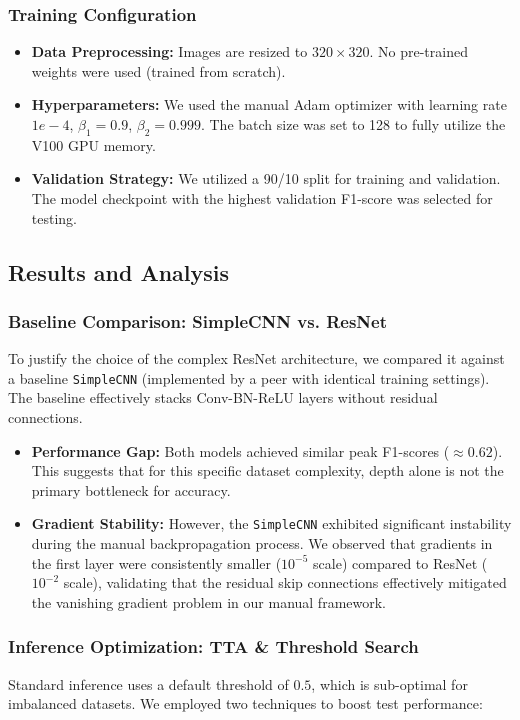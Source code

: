 \subsubsection{Training Configuration}
\begin{itemize}
    \item \textbf{Data Preprocessing:} Images are resized to $320 \times 320$. No pre-trained weights were used (trained from scratch).
    \item \textbf{Hyperparameters:} We used the manual Adam optimizer with learning rate $1e-4$, $\beta_1=0.9$, $\beta_2=0.999$. The batch size was set to 128 to fully utilize the V100 GPU memory.
    \item \textbf{Validation Strategy:} We utilized a 90/10 split for training and validation. The model checkpoint with the highest validation F1-score was selected for testing.
\end{itemize}

\subsection{Results and Analysis}

\subsubsection{Baseline Comparison: SimpleCNN vs. ResNet}
To justify the choice of the complex ResNet architecture, we compared it against a baseline \texttt{SimpleCNN} (implemented by a peer with identical training settings). The baseline effectively stacks Conv-BN-ReLU layers without residual connections.

\begin{itemize}
    \item \textbf{Performance Gap:} Both models achieved similar peak F1-scores ($\approx 0.62$). This suggests that for this specific dataset complexity, depth alone is not the primary bottleneck for accuracy.
    \item \textbf{Gradient Stability:} However, the \texttt{SimpleCNN} exhibited significant instability during the manual backpropagation process. We observed that gradients in the first layer were consistently smaller ($10^{-5}$ scale) compared to ResNet ($10^{-2}$ scale), validating that the residual skip connections effectively mitigated the vanishing gradient problem in our manual framework.
\end{itemize}

\subsubsection{Inference Optimization: TTA \& Threshold Search}
Standard inference uses a default threshold of $0.5$, which is sub-optimal for imbalanced datasets. We employed two techniques to boost test performance:

